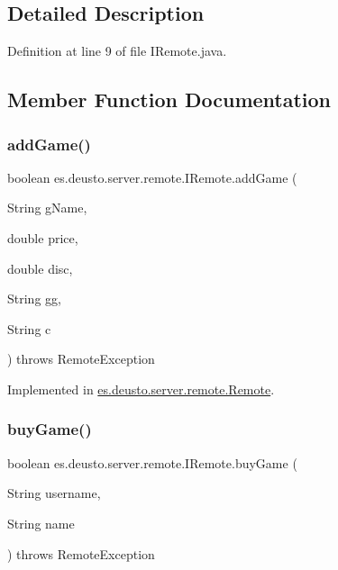 \subsection{Detailed Description}


Definition at line 9 of file I\+Remote.\+java.



\subsection{Member Function Documentation}
\mbox{\label{interfacees_1_1deusto_1_1server_1_1remote_1_1_i_remote_a991909db4d26d5be67bb3e0bcb501c7e}} 
\subsubsection{\texorpdfstring{add\+Game()}{addGame()}}
{\footnotesize\ttfamily boolean es.\+deusto.\+server.\+remote.\+I\+Remote.\+add\+Game (\begin{DoxyParamCaption}\item[{String}]{g\+Name,  }\item[{double}]{price,  }\item[{double}]{disc,  }\item[{String}]{gg,  }\item[{String}]{c }\end{DoxyParamCaption}) throws Remote\+Exception}



Implemented in \hyperlink{classes_1_1deusto_1_1server_1_1remote_1_1_remote_a81c61e602f9419408e0069b51bc1e740}{es.\+deusto.\+server.\+remote.\+Remote}.

\mbox{\label{interfacees_1_1deusto_1_1server_1_1remote_1_1_i_remote_ad2e6ee616bdc780b4057e63bf2ae8be7}} 
\subsubsection{\texorpdfstring{buy\+Game()}{buyGame()}}
{\footnotesize\ttfamily boolean es.\+deusto.\+server.\+remote.\+I\+Remote.\+buy\+Game (\begin{DoxyParamCaption}\item[{String}]{username,  }\item[{String}]{name }\end{DoxyParamCaption}) throws Remote\+Exception}



